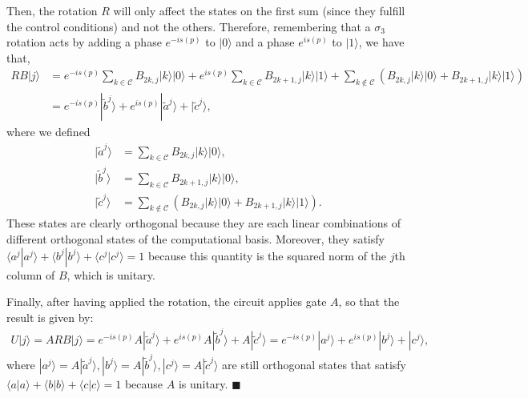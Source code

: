 \documentclass[10pt,letterpaper]{article} %
\begin{document}
Then, the rotation $R$ will only affect the states on the first sum (since they fulfill the control conditions)
and not the others. Therefore,  
remembering that a $\sigma_3$ rotation acts by adding a phase $e^{-is(p)}$ to $|0\rangle$
and a phase $e^{is(p)}$ to $|1\rangle$, we have that,
\begin{align}
RB|j\rangle& = e^{-is(p)} \sum_{k \in \mathcal{C}} B_{2k,j} |k\rangle |0\rangle + e^{is(p)} \sum_{k \in \mathcal{C}} B_{2k+1,j} |k\rangle |1\rangle 
+ \sum_{k \not\in \mathcal{C}} \left( B_{2k,j} |k\rangle|0\rangle  + B_{2k+1,j} |k \rangle |1\rangle  \right) \nonumber \\
& = e^{-is(p)} |\tilde{b}^{j}\rangle + e^{is(p)} |\tilde{a}^j\rangle + |\tilde{c}^j\rangle,
\end{align}
where we defined
\begin{align*}
|\tilde{a}^j \rangle &= \sum_{k \in \mathcal{C}} B_{2k,j}|k\rangle|0\rangle,\\
|\tilde{b}^j\rangle &= \sum_{k \in \mathcal{C}} B_{2k+1,j} |k\rangle |0 \rangle,\\
|\tilde{c}^j\rangle &= \sum_{k \not\in \mathcal{C}}\left( B_{2k,j} |k\rangle|0\rangle+ B_{2k+1,j} |k \rangle |1\rangle  \right).
\end{align*}
These states are clearly orthogonal because they are each linear combinations of different 
orthogonal states of the computational basis. 
Moreover, they satisfy  $\langle a^j| a^j\rangle + \langle b^j| b^j\rangle + \langle c^j| c^j\rangle = 1$ because this quantity is the squared norm of the $j$th column of $B$, 
which is unitary.

Finally, after having applied the rotation, the circuit applies gate $A$, 
so that the result is given by:
\begin{eqnarray}
U|j\rangle = ARB|j\rangle = e^{-is(p)} A |\tilde{a}^j\rangle + e^{is(p)} A |\tilde{b}^j\rangle + A |\tilde{c}^j\rangle = e^{-is(p)} |a^j\rangle + e^{is(p)} |b^j\rangle + |c^j\rangle,
\end{eqnarray}
where $|a^j\rangle = A |\tilde{a}^j\rangle, |b^j\rangle = A |\tilde{b}^j\rangle, |c^j\rangle = A |\tilde{c}^j\rangle$ are still orthogonal
states that satisfy $\langle a| a\rangle + \langle b| b\rangle + \langle c| c\rangle = 1$ because $A$ is unitary. $\blacksquare$  \\
 $\;$ \\
\end{document}
